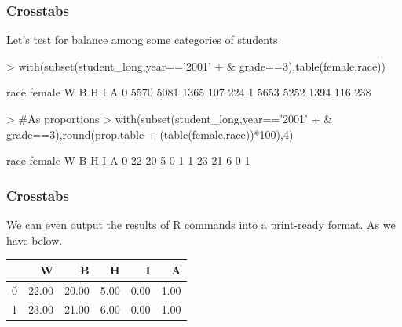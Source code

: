 \documentclass{beamer}
\begin{document}


  
\begin{frame}[containsverbatim]
\frametitle{Crosstabs}
Let's test for balance among some categories of students 
\begin{Schunk}
\begin{Sinput}
> with(subset(student_long,year=='2001' 
+             & grade==3),table(female,race))
\end{Sinput}
\begin{Soutput}
      race
female    W    B    H    I    A
     0 5570 5081 1365  107  224
     1 5653 5252 1394  116  238
\end{Soutput}
\end{Schunk}
\begin{Schunk}
\begin{Sinput}
> #As proportions
> with(subset(student_long,year=='2001' 
+             & grade==3),round(prop.table
+             (table(female,race))*100),4)
\end{Sinput}
\begin{Soutput}
      race
female  W  B  H  I  A
     0 22 20  5  0  1
     1 23 21  6  0  1
\end{Soutput}
\end{Schunk}
\end{frame}

\begin{frame}
\frametitle{Crosstabs}
We can even output the results of R commands into a print-ready format. As we have below.
\begin{table}[ht]
\begin{center}
\begin{tabular}{rrrrrr}
  \hline
 & W & B & H & I & A \\ 
  \hline
0 & 22.00 & 20.00 & 5.00 & 0.00 & 1.00 \\ 
  1 & 23.00 & 21.00 & 6.00 & 0.00 & 1.00 \\ 
   \hline
\end{tabular}
\end{center}
\end{table}\end{frame}
\end{document}
